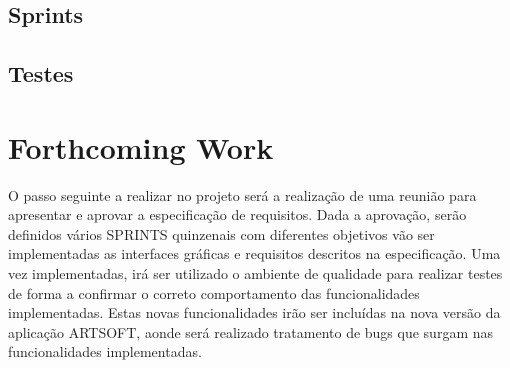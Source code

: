\documentclass[sigplan]{acmart}
\begin{document}
\subsection{Sprints}

\subsection{Testes}

\section{Forthcoming Work} \label{sec:forthcomingwork}


O passo seguinte a realizar no projeto será a realização de uma reunião para apresentar e aprovar a especificação de requisitos. Dada a aprovação, serão definidos vários SPRINTS quinzenais com diferentes objetivos vão ser implementadas as interfaces gráficas e requisitos descritos na especificação. Uma vez implementadas, irá ser utilizado o ambiente de qualidade para realizar testes de forma a confirmar o correto comportamento das funcionalidades implementadas. Estas novas funcionalidades irão ser incluídas na nova versão da aplicação ARTSOFT, aonde será realizado tratamento de bugs que surgam nas funcionalidades implementadas.



\end{document}
